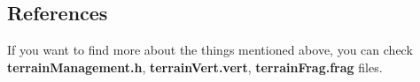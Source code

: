 \begin{figure}[hbt!]
	\centering
	\qquad
	\caption{}
\end{figure}

\subsection{References}

If you want to find more about the things mentioned above, you can check \textbf{terrainManagement.h}, \textbf{terrainVert.vert}, \textbf{terrainFrag.frag} files.

\newpage